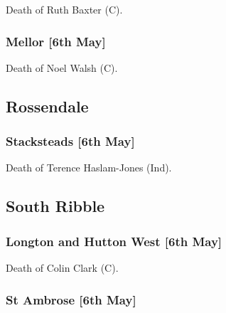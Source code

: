 \documentclass[a4paper,openany]{book}
\begin{document}
\begin{resultsiii}

Death of Ruth Baxter (C).

\subsubsection*{Mellor \hspace*{\fill}\nolinebreak[1]%
	\enspace\hspace*{\fill}
	[6th May]}


Death of Noel Walsh (C).

\subsection*{Rossendale}

\subsubsection*{Stacksteads \hspace*{\fill}\nolinebreak[1]%
	\enspace\hspace*{\fill}
	[6th May]}


Death of Terence Haslam-Jones (Ind).

\subsection*{South Ribble}

\subsubsection*{Longton and Hutton West \hspace*{\fill}\nolinebreak[1]%
	\enspace\hspace*{\fill}
	[6th May]}


Death of Colin Clark (C).

\subsubsection*{St Ambrose \hspace*{\fill}\nolinebreak[1]%
	\enspace\hspace*{\fill}
	[6th May]}


\end{resultsiii}
\end{document}
